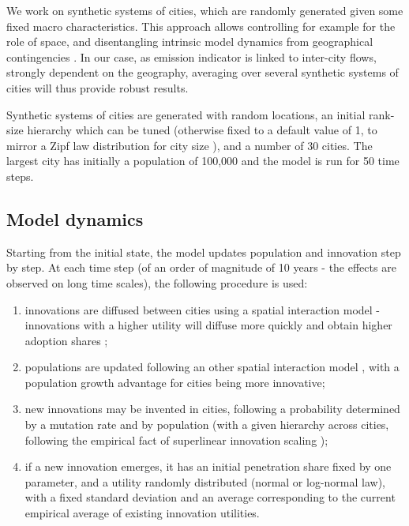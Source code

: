 \documentclass[final,5p,times,twocolumn,authoryear]{elsarticle}
\begin{document}
We work on synthetic systems of cities, which are randomly generated given some fixed macro characteristics. This approach allows controlling for example for the role of space, and disentangling intrinsic model dynamics from geographical contingencies \citep{raimbault2019space}. In our case, as emission indicator is linked to inter-city flows, strongly dependent on the geography, averaging over several synthetic systems of cities will thus provide robust results.

Synthetic systems of cities are generated with random locations, an initial rank-size hierarchy which can be tuned (otherwise fixed to a default value of 1, to mirror a Zipf law distribution for city size \citep{cottineau2017metazipf}), and a number of 30 cities. The largest city has initially a population of 100,000 and the model is run for 50 time steps. 


\subsection{Model dynamics}

Starting from the initial state, the model updates population and innovation step by step. At each time step (of an order of magnitude of 10 years - the effects are observed on long time scales), the following procedure is used:

\begin{enumerate}
	\item innovations are diffused between cities using a spatial interaction model - innovations with a higher utility will diffuse more quickly and obtain higher adoption shares \citep{hagerstrand1968innovation};
	\item populations are updated following an other spatial interaction model \citep{raimbault2020indirect}, with a population growth advantage for cities being more innovative;
	\item new innovations may be invented in cities, following a probability determined by a mutation rate and by population (with a given hierarchy across cities, following the empirical fact of superlinear innovation scaling \citep{arbesman2009superlinear});
	\item if a new innovation emerges, it has an initial penetration share fixed by one parameter, and a utility randomly distributed (normal or log-normal law), with a fixed standard deviation and an average corresponding to the current empirical average of existing innovation utilities.
\end{enumerate}
\end{document}
